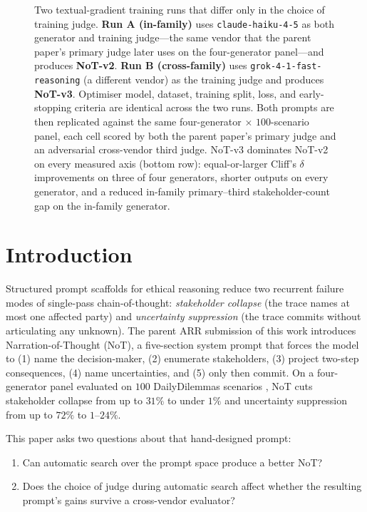 \documentclass[11pt]{article}
\begin{document}
\begin{figure}[!t]
{\begin{tikzpicture}
\end{tikzpicture}%
}
\caption{Two textual-gradient training runs that differ only in the choice of training judge.
\textbf{Run A (in-family)} uses \texttt{claude-haiku-4-5} as both generator and training judge---the same vendor that the parent paper's primary judge later uses on the four-generator panel---and produces \textbf{NoT-v2}.
\textbf{Run B (cross-family)} uses \texttt{grok-4-1-fast-reasoning} (a different vendor) as the training judge and produces \textbf{NoT-v3}.
Optimiser model, dataset, training split, loss, and early-stopping criteria are identical across the two runs.
Both prompts are then replicated against the same four-generator $\times$ $100$-scenario panel, each cell scored by both the parent paper's primary judge and an adversarial cross-vendor third judge.
NoT-v3 dominates NoT-v2 on every measured axis (bottom row): equal-or-larger Cliff's $\delta$ improvements on three of four generators, shorter outputs on every generator, and a reduced in-family primary--third stakeholder-count gap on the in-family generator.}
\label{fig:hero}
\end{figure}

\section{Introduction}
\label{sec:intro}

Structured prompt scaffolds for ethical reasoning reduce two recurrent failure modes of single-pass chain-of-thought: \emph{stakeholder collapse} (the trace names at most one affected party) and \emph{uncertainty suppression} (the trace commits without articulating any unknown).
The parent ARR submission of this work \citep{anon24parent} introduces Narration-of-Thought (NoT), a five-section system prompt that forces the model to (1) name the decision-maker, (2) enumerate stakeholders, (3) project two-step consequences, (4) name uncertainties, and (5) only then commit.
On a four-generator panel evaluated on $100$ DailyDilemmas scenarios \citep{chiu24}, NoT cuts stakeholder collapse from up to $31\%$ to under $1\%$ and uncertainty suppression from up to $72\%$ to $1$--$24\%$.

This paper asks two questions about that hand-designed prompt:
\begin{enumerate}\setlength{\itemsep}{1pt}
\item Can automatic search over the prompt space produce a better NoT?
\item Does the choice of judge during automatic search affect whether the resulting prompt's gains survive a cross-vendor evaluator?
\end{enumerate}
\end{document}
